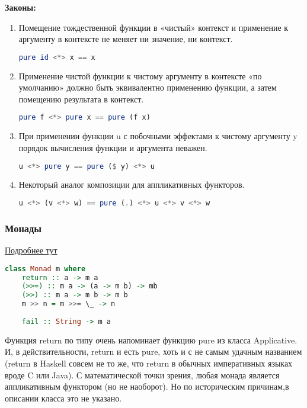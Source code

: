 \documentclass{article}
\begin{document}
\textbf{Законы:}
\begin{enumerate}
	\item Помещение тождественной функции в «чистый» контекст и применение к аргументу в контексте не меняет ни значение, ни контекст.
	\begin{lstlisting}[language=Haskell]
pure id <*> x == x
	\end{lstlisting}
	\item Применение чистой функции к чистому аргументу в контексте «по умолчанию» должно быть эквивалентно применению функции, а затем помещению результата в контекст.
	\begin{lstlisting}[language=Haskell]
pure f <*> pure x == pure (f x)
	\end{lstlisting}
	\item При применении функции u с побочными эффектами к чистому аргументу y порядок вычисления функции и аргумента неважен.
	\begin{lstlisting}[language=Haskell]
u <*> pure y == pure ($ y) <*> u
	\end{lstlisting}
	\item Некоторый аналог композиции для аппликативных функторов.
	\begin{lstlisting}[language=Haskell]
u <*> (v <*> w) == pure (.) <*> u <*> v <*> w
	\end{lstlisting}
\end{enumerate} 

\subsubsection{Монады}
\href{http://cmc-msu-ai.github.io/haskell-course/lecture/2013/09/08/applicative-and-monad.html}{Подробнее тут}
\begin{lstlisting}[language=Haskell]
class Monad m where
	return :: a -> m a
	(>>=) :: m a -> (a -> m b) -> mb
	(>>) :: m a -> m b -> m b
	m >> n = m >>= \_ -> n
	
	fail :: String -> m a
\end{lstlisting}

Функция return по типу очень напоминает функцию pure из класса Applicative. И, в действительности, return и есть pure, хоть и с не самым удачным названием (return в Haskell совсем не то же, что return в обычных императивных языках вроде C или Java). С математической точки зрения, любая монада является аппликативным функтором (но не наоборот). Но по историческим причинам,в описании класса это не указано.
\end{document}
